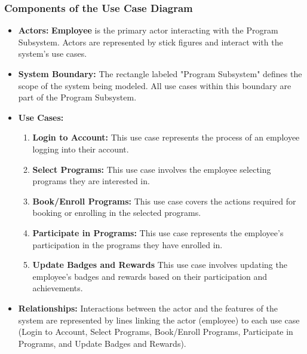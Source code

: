 \subsubsection{Components of the Use Case Diagram }
\begin{itemize}
    \item \textbf{Actors: }\textbf{Employee} is the primary actor interacting with the Program Subsystem. Actors are represented by stick figures  and interact with the system's use cases.
    \item \textbf{System Boundary: }The rectangle labeled "Program Subsystem" defines the scope of the system being modeled. All use cases within this boundary are part of the Program Subsystem. 
    \item \textbf{Use Cases: }
    \begin{enumerate}
        \item \textbf{Login to Account: }This use case represents the process of an employee logging into their account. 
        \item \textbf{Select Programs: }This use case involves the employee selecting programs they are interested in.  
        \item \textbf{Book/Enroll Programs: } This use case covers the actions required for booking or enrolling in the selected programs. 
        \item  \textbf{Participate in Programs: } This use case represents the employee's participation in the programs they have enrolled in.
        \item  \textbf{Update Badges and Rewards } This use case involves updating the employee's badges and rewards based on their participation and achievements. 
    \end{enumerate}
    \item \textbf{Relationships: }Interactions between the actor and the features of the system are represented by lines linking the actor (employee) to each use case (Login to Account, Select Programs, Book/Enroll Programs, Participate in Programs, and Update Badges and Rewards). 
\end{itemize}

